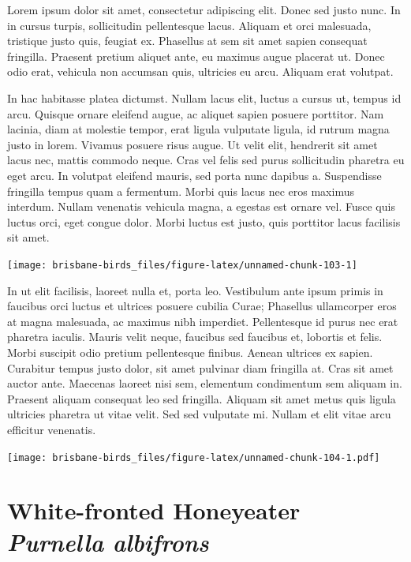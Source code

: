 \documentclass[]{book}
\let\origfigure\figure
\let\endorigfigure\endfigure
\renewenvironment{figure}[1][2] {
  \expandafter\origfigure\expandafter[H]
} {
  \endorigfigure
}
\begin{document}
Lorem ipsum dolor sit amet, consectetur adipiscing elit. Donec sed justo
nunc. In in cursus turpis, sollicitudin pellentesque lacus. Aliquam et
orci malesuada, tristique justo quis, feugiat ex. Phasellus at sem sit
amet sapien consequat fringilla. Praesent pretium aliquet ante, eu
maximus augue placerat ut. Donec odio erat, vehicula non accumsan quis,
ultricies eu arcu. Aliquam erat volutpat.

In hac habitasse platea dictumst. Nullam lacus elit, luctus a cursus ut,
tempus id arcu. Quisque ornare eleifend augue, ac aliquet sapien posuere
porttitor. Nam lacinia, diam at molestie tempor, erat ligula vulputate
ligula, id rutrum magna justo in lorem. Vivamus posuere risus augue. Ut
velit elit, hendrerit sit amet lacus nec, mattis commodo neque. Cras vel
felis sed purus sollicitudin pharetra eu eget arcu. In volutpat eleifend
mauris, sed porta nunc dapibus a. Suspendisse fringilla tempus quam a
fermentum. Morbi quis lacus nec eros maximus interdum. Nullam venenatis
vehicula magna, a egestas est ornare vel. Fusce quis luctus orci, eget
congue dolor. Morbi luctus est justo, quis porttitor lacus facilisis sit
amet.

\begin{figure}
\texttt{[image: brisbane-birds\_files/figure-latex/unnamed-chunk-103-1]} \caption{insert figure caption}\label{fig:unnamed-chunk-103}
\end{figure}

In ut elit facilisis, laoreet nulla et, porta leo. Vestibulum ante ipsum
primis in faucibus orci luctus et ultrices posuere cubilia Curae;
Phasellus ullamcorper eros at magna malesuada, ac maximus nibh
imperdiet. Pellentesque id purus nec erat pharetra iaculis. Mauris velit
neque, faucibus sed faucibus et, lobortis et felis. Morbi suscipit odio
pretium pellentesque finibus. Aenean ultrices ex sapien. Curabitur
tempus justo dolor, sit amet pulvinar diam fringilla at. Cras sit amet
auctor ante. Maecenas laoreet nisi sem, elementum condimentum sem
aliquam in. Praesent aliquam consequat leo sed fringilla. Aliquam sit
amet metus quis ligula ultricies pharetra ut vitae velit. Sed sed
vulputate mi. Nullam et elit vitae arcu efficitur venenatis.

\begin{figure}
\centering
\texttt{[image: brisbane-birds\_files/figure-latex/unnamed-chunk-104-1.pdf]}
\caption{\label{fig:unnamed-chunk-104}insert figure caption}
\end{figure}

\section{\texorpdfstring{White-fronted Honeyeater \emph{Purnella
albifrons}}{White-fronted Honeyeater Purnella albifrons}}\label{white-fronted-honeyeater-purnella-albifrons}
\end{document}
